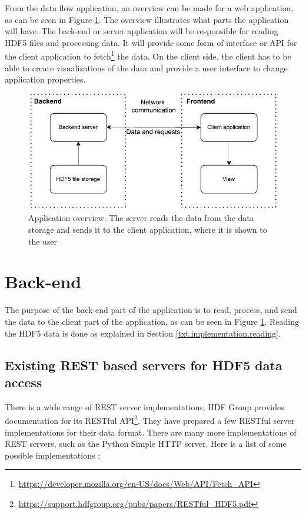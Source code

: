 From the data flow application, an overview can be made for a web application, as can be seen in Figure \ref{fig:app_overview}. The overview illustrates what parts the application will have. The back-end or server application will be responsible for reading HDF5 files and processing data. It will provide some form of interface or API for the client application to fetch\footnote{\url{https://developer.mozilla.org/en-US/docs/Web/API/Fetch\_API}} the data. On the client side, the client has to be able to create visualizations of the data and provide a user interface to change application properties.

\begin{figure}
    \centering
    \includegraphics{pdf/appstack_general.drawio.pdf}
    \caption{Application overview. The server reads the data from the data storage and sends it to the client application, where it is shown to the user}
    \label{fig:app_overview}
\end{figure}


\section{Back-end}\label{txt.design.backend}

The purpose of the back-end part of the application is to read, process, and send the data to the client part of the application, as can be seen in Figure \ref{fig:app_overview}. Reading the HDF5 data is done as explained in Section \ref{txt.implementation.reading}.


\subsection{Existing REST based servers for HDF5 data access}\label{txt.design.rest}

There is a wide range of REST server implementations; HDF Group provides documentation for its RESTful API\footnote{\url{https://support.hdfgroup.org/pubs/papers/RESTful\_HDF5.pdf}}. They have prepared a few RESTful server implementations for their data format. There are many more implementations of REST servers, such as the Python Simple HTTP server. Here is a list of some possible implementations \cite{hdfrest}:

